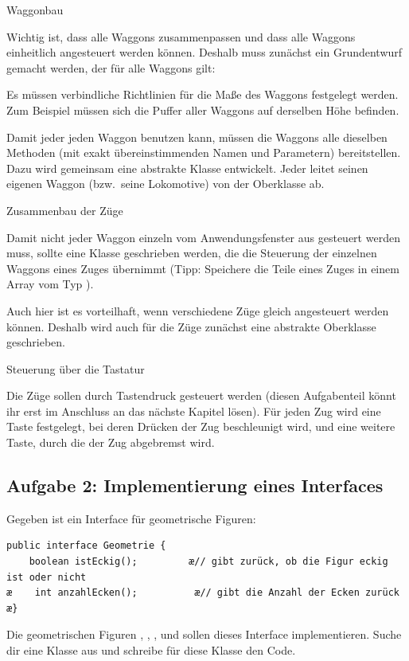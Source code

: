 \begin{compactenum}[1.]
\item Waggonbau

Wichtig ist, dass alle Waggons zusammenpassen und dass alle Waggons einheitlich
angesteuert werden können. Deshalb muss zunächst ein Grundentwurf gemacht
werden, der für alle Waggons gilt:
\begin{compactenum}[a)]
\item Es müssen verbindliche Richtlinien für die Maße des Waggons festgelegt
werden. Zum Beispiel müssen sich die Puffer aller Waggons auf derselben Höhe
befinden.
\item Damit jeder jeden Waggon benutzen kann, müssen die Waggons alle dieselben
Methoden (mit exakt übereinstimmenden Namen und Parametern) bereitstellen. Dazu
wird gemeinsam eine abstrakte Klasse  entwickelt. Jeder leitet
seinen eigenen Waggon (bzw.\ seine Lokomotive) von der Oberklasse
 ab.
\end{compactenum}

\item Zusammenbau der Züge

Damit nicht jeder Waggon einzeln vom Anwendungsfenster aus gesteuert werden
muss, sollte eine Klasse  geschrieben werden, die die Steuerung der
einzelnen Waggons eines Zuges übernimmt (Tipp: Speichere die Teile eines Zuges
in einem Array vom Typ ).

Auch hier ist es vorteilhaft, wenn verschiedene Züge gleich angesteuert werden
können. Deshalb wird auch für die Züge zunächst eine abstrakte Oberklasse
geschrieben.

\item Steuerung über die Tastatur

Die Züge sollen durch Tastendruck gesteuert werden (diesen Aufgabenteil könnt
ihr erst im Anschluss an das nächste Kapitel lösen). Für jeden Zug wird eine
Taste festgelegt, bei deren Drücken der Zug beschleunigt wird, und eine weitere
Taste, durch die der Zug abgebremst wird.
\end{compactenum}


\subsection{Aufgabe 2: Implementierung eines Interfaces}

Gegeben ist ein Interface für geometrische Figuren:

\begin{lstlisting}
public interface Geometrie {
    boolean istEckig();         æ// gibt zurück, ob die Figur eckig ist oder nicht
æ    int anzahlEcken();          æ// gibt die Anzahl der Ecken zurück
æ}
\end{lstlisting}

Die geometrischen Figuren , ,
,  und  sollen dieses
Interface implementieren. Suche dir eine Klasse aus und schreibe für diese
Klasse den Code.
